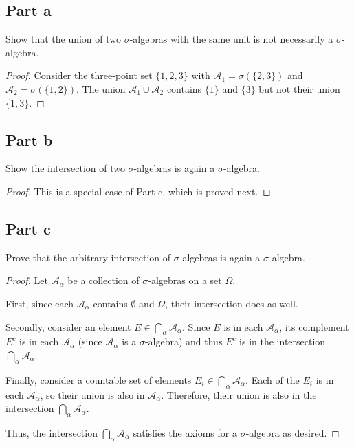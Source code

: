 \documentclass[paper=a4, fontsize=11pt]{scrartcl} %
\numberwithin{equation}{section} %
\numberwithin{figure}{section} %
\numberwithin{table}{section} %
\begin{document}
\subsection*{Part a}
Show that the union of two $\sigma$-algebras with the same unit is not necessarily
a $\sigma$-algebra.
\\
\begin{proof}
Consider the three-point set $\{1,2,3\}$ with $\mathcal{A}_1 = \sigma\left(\{2,3\}\right)$
and $\mathcal{A}_2 = \sigma\left(\{1,2\}\right)$.
The union $\mathcal{A}_1 \cup \mathcal{A}_2$ contains $\{1\}$ and $\{3\}$ but not their
union $\{1,3\}$.
\end{proof}

\subsection*{Part b}
Show the intersection of two $\sigma$-algebras is again a $\sigma$-algebra.
\\
\begin{proof}
This is a special case of Part c, which is proved next.
\end{proof}

\subsection*{Part c}
Prove that the arbitrary intersection of $\sigma$-algebras is again a $\sigma$-algebra.
\\
\begin{proof}
Let $\mathcal{A}_{\alpha}$ be a collection of $\sigma$-algebras on a set $\Omega$.

First, since each $\mathcal{A}_{\alpha}$ contains $\emptyset$ and $\Omega$, their intersection
does as well.

Secondly, consider an element $E \in \bigcap_{\alpha} \mathcal{A}_{\alpha}$.
Since $E$ is in each $\mathcal{A}_{\alpha}$, its complement $E^c$ is in each $\mathcal{A}_{\alpha}$ 
(since $\mathcal{A}_{\alpha}$ is a $\sigma$-algebra) and thus $E^c$ is in the intersection
$\bigcap_{\alpha} \mathcal{A}_{\alpha}$.

Finally, consider a countable set of elements $E_i \in \bigcap_{\alpha} \mathcal{A}_{\alpha}$.
Each of the $E_i$ is in each $\mathcal{A}_{\alpha}$, so their union is also in $\mathcal{A}_{\alpha}$.
Therefore, their union is also in the intersection $\bigcap_{\alpha} \mathcal{A}_{\alpha}$.

Thus, the intersection $\bigcap_{\alpha} \mathcal{A}_{\alpha}$ satisfies the axioms for
a $\sigma$-algebra as desired. 
\end{proof}
\end{document}
